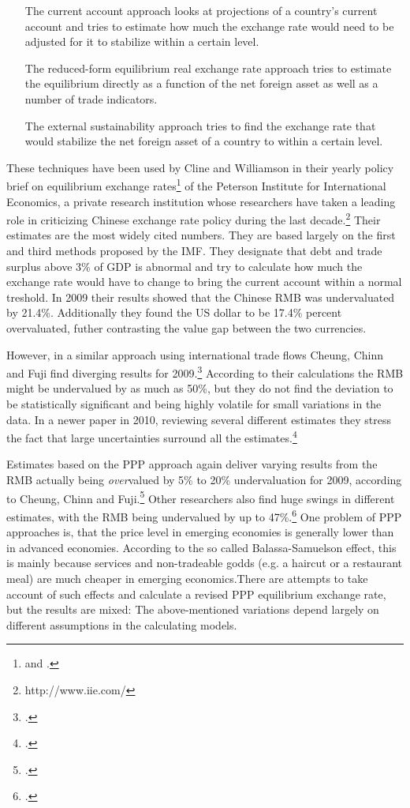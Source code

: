 \begin{enumerate}
	\item[The current account approach]{ looks at projections of a 
		country's current account and tries to estimate how much the 
	exchange rate would need to be adjusted for it to stabilize within a 
certain level.}
\item[The reduced-form equilibrium real exchange rate approach]{
	tries to estimate the equilibrium directly as a function of the net 
foreign asset as well as a number of trade indicators.}
\item[The external sustainability approach]{ tries to find the exchange 
	rate that would stabilize the net foreign asset of a country to 
within a certain level.}
\end{enumerate}

These techniques have been used by Cline and Williamson in 
their yearly policy brief on equilibrium exchange 
rates\footnote{\cite{Cline2009} and \cite{Cline2012}.} of the Peterson Institute for International Economics, a private research institution whose researchers have taken a leading role in criticizing Chinese exchange rate policy during the last decade.\footnote{http://www.iie.com/}  Their estimates are the most widely cited numbers. They are based 
largely on the first and third methods proposed by the IMF. They 
designate that debt and trade surplus above 3\% of GDP is abnormal and 
try to calculate how much the exchange rate would have to change to 
bring the current account within a normal treshold. In 2009 their 
results showed that the Chinese RMB was undervaluated by 21.4\%. Additionally they found the US dollar to be 17.4\% percent overvaluated, 
futher contrasting the value gap between the two currencies.

However, in a similar approach using international trade flows Cheung, Chinn and Fuji find diverging results for 2009.\footnote{\cite{Cheung2009}.} According to their calculations the RMB might be undervalued by as much as 50\%, but they do not find the deviation to be statistically significant and being highly volatile for small variations in the data. In a newer paper in 2010, reviewing several different estimates they stress the fact that large uncertainties surround all the estimates.\footnote{\cite{Cheung2010}.}

Estimates based on the PPP approach again deliver varying results from the RMB actually being \emph{over}valued by 5\% to 20\% undervaluation for 2009, according to Cheung, Chinn and Fuji.\footnote{\cite[pp. 82]{Cheung2010}.} Other researchers also find huge swings in different estimates, with the RMB being undervalued by up to 47\%.\footnote{\cite[pp. 72]{Subramanian2010}.} One problem of PPP approaches is, that the price level in emerging economies is generally lower than in advanced economies. According to the so called Balassa-Samuelson effect, this is mainly because services and non-tradeable godds (e.g. a haircut or a restaurant meal) are much cheaper in emerging economics.There are attempts to take account of such effects and calculate a revised PPP equilibrium exchange rate, but the results are mixed: The above-mentioned variations depend largely on different assumptions in the calculating models.

